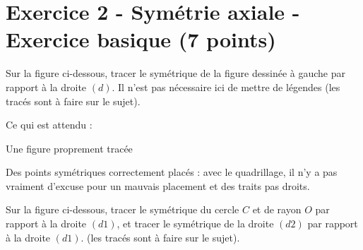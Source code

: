 \documentclass[answers]{exam}
\begin{document}
\section*{Exercice 2 - Symétrie axiale - Exercice basique (7 points)}

\begin{questions}
  \question[2] Sur la figure ci-dessous, tracer le symétrique de la figure dessinée à gauche par rapport à la droite $(d)$. Il n'est pas nécessaire ici de mettre de légendes (les tracés sont à faire sur le sujet).
\end{questions}

\begin{solution}
      \begin{Indication}

Ce qui est attendu : 
\begin{compactitem}
\item Une figure proprement tracée
\item Des points symétriques correctement placés : avec le quadrillage, il n'y a pas vraiment d'excuse pour un mauvais placement et des traits pas droits.
\end{compactitem}

      \end{Indication}


      \end{solution}

\begin{questions}
  \question[5] Sur la figure ci-dessous, tracer le symétrique du cercle $C$ et de rayon $O$ par rapport à la droite $(d1)$, et tracer le symétrique de la droite $(d2)$ par rapport à la droite $(d1)$.  (les tracés sont à faire sur le sujet).
\end{questions}
\end{document}
